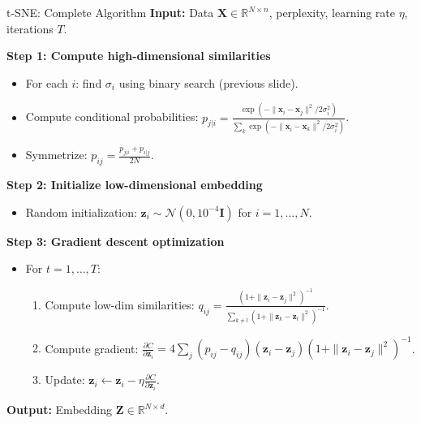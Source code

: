 \documentclass{beamer}
\begin{document}
\begin{frame}{t-SNE: Complete Algorithm}
  \textbf{Input:} Data $\mathbf{X} \in \mathbb{R}^{N \times n}$, perplexity, learning rate $\eta$, iterations $T$.
  
  \vspace{0.3cm}
  \textbf{Step 1: Compute high-dimensional similarities}
  \begin{itemize}
    \item For each $i$: find $\sigma_i$ using binary search (previous slide).
    \item Compute conditional probabilities: $p_{j|i} = \frac{\exp(-\|\mathbf{x}_i - \mathbf{x}_j\|^2 / 2\sigma_i^2)}{\sum_k \exp(-\|\mathbf{x}_i - \mathbf{x}_k\|^2 / 2\sigma_i^2)}$.
    \item Symmetrize: $p_{ij} = \frac{p_{j|i} + p_{i|j}}{2N}$.
  \end{itemize}
  
  \textbf{Step 2: Initialize low-dimensional embedding}
  \begin{itemize}
    \item Random initialization: $\mathbf{z}_i \sim \mathcal{N}(0, 10^{-4}\mathbf{I})$ for $i = 1, \ldots, N$.
  \end{itemize}
  
  \textbf{Step 3: Gradient descent optimization}
  \begin{itemize}
    \item For $t = 1, \ldots, T$:
    \begin{enumerate}
      \item Compute low-dim similarities: $q_{ij} = \frac{(1 + \|\mathbf{z}_i - \mathbf{z}_j\|^2)^{-1}}{\sum_{k\neq l} (1 + \|\mathbf{z}_k - \mathbf{z}_l\|^2)^{-1}}$.
      \item Compute gradient: $\frac{\partial C}{\partial \mathbf{z}_i} = 4\sum_j (p_{ij} - q_{ij})(\mathbf{z}_i - \mathbf{z}_j)(1 + \|\mathbf{z}_i - \mathbf{z}_j\|^2)^{-1}$.
      \item Update: $\mathbf{z}_i \leftarrow \mathbf{z}_i - \eta \frac{\partial C}{\partial \mathbf{z}_i}$.
    \end{enumerate}
  \end{itemize}
  
  \textbf{Output:} Embedding $\mathbf{Z} \in \mathbb{R}^{N \times d}$.
\end{frame}
\end{document}
